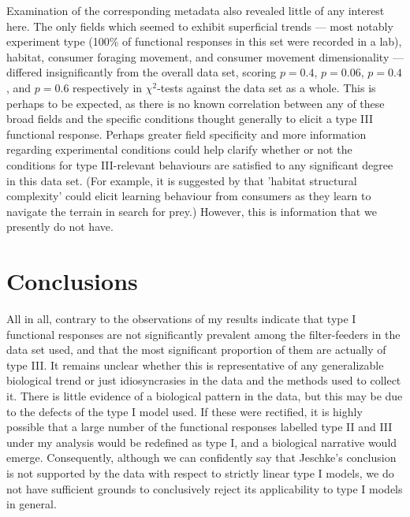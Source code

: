 \documentclass[11pt]{article}
\begin{document}
    Examination of the corresponding metadata also revealed little of any interest here. The only fields which seemed to exhibit superficial trends — most notably experiment type (100\% of functional responses in this set were recorded in a lab), habitat, consumer foraging movement, and consumer movement dimensionality — differed insignificantly from the overall data set, scoring $p=0.4$, $p=0.06$, $p=0.4$, and $p=0.6$ respectively in $\chi^2$-tests against the data set as a whole. This is perhaps to be expected, as there is no known correlation between any of these broad fields and the specific conditions thought generally to elicit a type III functional response. Perhaps greater field specificity and more information regarding experimental conditions could help clarify whether or not the conditions for type III-relevant behaviours are satisfied to any significant degree in this data set. (For example, it is suggested by \citet{pawar2012dimensionality} that 'habitat structural complexity' could elicit learning behaviour from consumers as they learn to navigate the terrain in search for prey.) However, this is information that we presently do not have.
    
    \section{Conclusions}
    
    All in all, contrary to the observations of \citet{jeschke2004consumer} my results indicate that type I functional responses are not significantly prevalent among the filter-feeders in the data set used, and that the most significant proportion of them are actually of type III. It remains unclear whether this is representative of any generalizable biological trend or just idiosyncrasies in the data and the methods used to collect it. There is little evidence of a biological pattern in the data, but this may be due to the defects of the type I model used. If these were rectified, it is highly possible that a large number of the functional responses labelled type II and III under my analysis would be redefined as type I, and a biological narrative would emerge. Consequently, although we can confidently say that Jeschke's conclusion is not supported by the data with respect to strictly linear type I models, we do not have sufficient grounds to conclusively reject its applicability to type I models in general.

    \newpage
    
    
\end{document}
